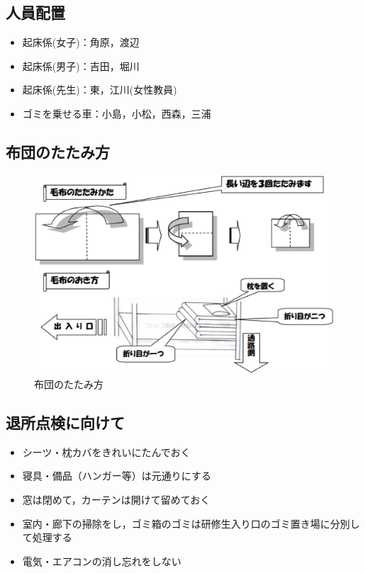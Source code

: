 \subsection{人員配置}
\begin{itemize}
\item 起床係(女子)：角原，渡辺
\item 起床係(男子)：吉田，堀川
\item 起床係(先生)：東，江川(女性教員)
\item ゴミを乗せる車：小島，小松，西森，三浦
\end{itemize}

\clearpage

\subsection{布団のたたみ方}
\begin{figure}[h]
\begin{center}
\includegraphics[scale=0.5]{./16/futon_katazuke.eps}
\caption{布団のたたみ方}
\label{fig:futon_katazuke}
\end{center}
\end{figure}

\subsection{退所点検に向けて}
\begin{itemize}
\item シーツ・枕カバをきれいにたんでおく
\item 寝具・備品（ハンガー等）は元通りにする
\item 窓は閉めて，カーテンは開けて留めておく
\item 室内・廊下の掃除をし，ゴミ箱のゴミは研修生入り口のゴミ置き場に分別して処理する
\item 電気・エアコンの消し忘れをしない
\end{itemize}


